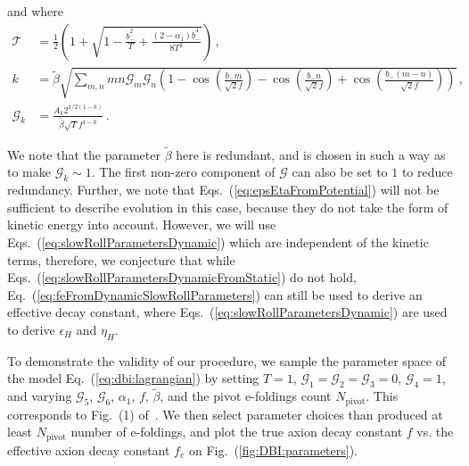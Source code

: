 \documentclass[12pt]{article}
\begin{document}
and where
\begin{align} %
  \mathcal{T} &= \frac{1}{2} \left(
      1
    + \sqrt{1 - \frac{{\dot b}_-^2}{T} + \frac{\left(2 - \alpha_1\right){\dot b}_-^4}{8 T^2}}
  \right)\,,\\
  k &= \tilde\beta \sqrt{\sum_{m, n} m n \mathcal{G}_m \mathcal{G}_n \left(
      1
    - \cos\left(\frac{b_- m}{\sqrt{2} f}\right)
    - \cos\left(\frac{b_- n}{\sqrt{2} f}\right)
    + \cos\left(\frac{b_- \left(m - n\right)}{\sqrt{2} f}\right)
  \right)}\,,\\
  \mathcal{G}_k &= \frac{A_k 2^{1 / 2 \left(1 - k\right)}}{\tilde\beta \sqrt{T} f^{1 - k}}\,.
\end{align}

We note that the parameter $\tilde\beta$ here is redundant, and is chosen in such a way as to make $\mathcal{G}_k \sim 1$.
The first non-zero component of $\mathcal{G}$ can also be set to $1$ to reduce redundancy.
Further, we note that Eqs.~(\ref{eq:epsEtaFromPotential}) will not be sufficient to describe evolution in this case, because they do not take the form of kinetic energy into account.
However, we will use Eqs.~(\ref{eq:slowRollParametersDynamic}) which are independent of the kinetic terms, therefore, we conjecture that while Eqs.~(\ref{eq:slowRollParametersDynamicFromStatic}) do not hold, Eq.~(\ref{eq:feFromDynamicSlowRollParameters}) can still be used to derive an effective decay constant, where Eqs.~(\ref{eq:slowRollParametersDynamic}) are used to derive $\epsilon_H$ and $\eta_H$.

To demonstrate the validity of our procedure, we sample the parameter space of the model Eq.~(\ref{eq:dbi:lagrangian}) by setting $T = 1$, $\mathcal{G}_1 = \mathcal{G}_2 = \mathcal{G}_3 = 0$, $\mathcal{G}_4 = 1$, and varying $\mathcal{G}_5$, $\mathcal{G}_6$, $\alpha_1$, $f$, $\tilde\beta$, and the pivot e-foldings count $N_\text{pivot}$.
This corresponds to Fig.~(1) of~\cite{Nath:2018xxe}.
We then select parameter choices than produced at least $N_\text{pivot}$ number of e-foldings, and plot the true axion decay constant $f$ vs. the effective axion decay constant $f_e$ on Fig.~(\ref{fig:DBI:parameters}).

\end{document}
